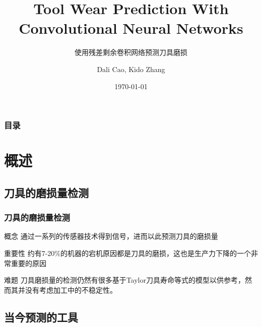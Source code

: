 \documentclass[12pt,aspectratio=169]{beamer}
\author{Dali Cao, Kido Zhang}
\title{Tool Wear Prediction With Convolutional Neural Networks}
\subtitle{使用残差剩余卷积网络预测刀具磨损}
\institute[NWPU]{西北工业大学机电学院}
\date{\today}
\begin{document}
	\maketitle
	
	\begin{frame}
		\frametitle{目录}
		\setcounter{tocdepth}{1}
		\tableofcontents
	\end{frame}
	\section{概述}
	\subsection{刀具的磨损量检测}
	
	\begin{frame}
		\frametitle{刀具的磨损量检测}
		
		\begin{block}{概念}
			通过一系列的传感器技术得到信号，进而以此预测刀具的磨损量
		\end{block}
		
		\begin{block}{重要性}
			约有7-20\%的机器的宕机原因都是刀具的磨损，这也是生产力下降的一个非常重要的原因\cite{kegg1984one,kurada1997review}
		\end{block}
		
		\begin{block}{难题}
			刀具磨损量的检测仍然有很多基于Taylor\cite{marksberry2008comprehensive}刀具寿命等式的模型以供参考，然而其并没有考虑加工中的不稳定性。
		\end{block}
		
	\end{frame}
	
	
	\subsection{当今预测的工具}
	
\end{document}
